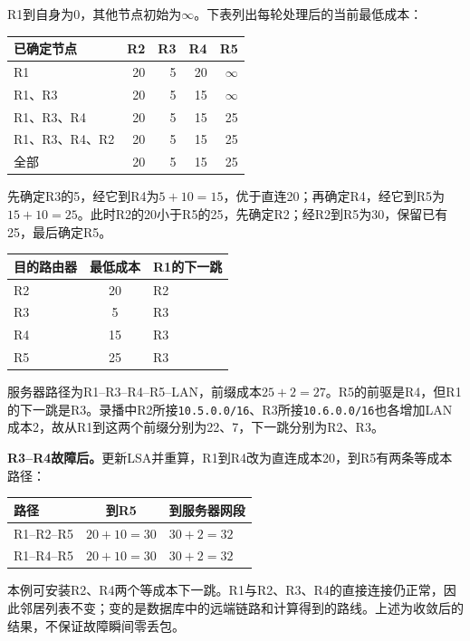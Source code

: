 \begin{workedsolution}
R1到自身为0，其他节点初始为$\infty$。下表列出每轮处理后的当前最低成本：
\begin{center}
\small
\begin{tabular}{@{}lrrrr@{}}
\toprule
已确定节点 & R2 & R3 & R4 & R5 \\
\midrule
R1 & 20 & 5 & 20 & $\infty$ \\
R1、R3 & 20 & 5 & 15 & $\infty$ \\
R1、R3、R4 & 20 & 5 & 15 & 25 \\
R1、R3、R4、R2 & 20 & 5 & 15 & 25 \\
全部 & 20 & 5 & 15 & 25 \\
\bottomrule
\end{tabular}
\end{center}

先确定R3的5，经它到R4为$5+10=15$，优于直连20；再确定R4，经它到R5为$15+10=25$。此时R2的20小于R5的25，先确定R2；经R2到R5为30，保留已有25，最后确定R5。

\begin{center}
\small
\begin{tabular}{@{}lcl@{}}
\toprule
目的路由器 & 最低成本 & R1的下一跳 \\
\midrule
R2 & 20 & R2 \\
R3 & 5 & R3 \\
R4 & 15 & R3 \\
R5 & 25 & R3 \\
\bottomrule
\end{tabular}
\end{center}

服务器路径为R1--R3--R4--R5--LAN，前缀成本$25+2=27$。R5的前驱是R4，但R1的下一跳是R3。录播中R2所接\texttt{10.5.0.0/16}、R3所接\texttt{10.6.0.0/16}也各增加LAN成本2，故从R1到这两个前缀分别为22、7，下一跳分别为R2、R3。

\textbf{R3--R4故障后。}更新LSA并重算，R1到R4改为直连成本20，到R5有两条等成本路径：
\begin{center}
\small
\begin{tabular}{@{}lcl@{}}
\toprule
路径 & 到R5 & 到服务器网段 \\
\midrule
R1--R2--R5 & $20+10=30$ & $30+2=32$ \\
R1--R4--R5 & $20+10=30$ & $30+2=32$ \\
\bottomrule
\end{tabular}
\end{center}
本例可安装R2、R4两个等成本下一跳。R1与R2、R3、R4的直接连接仍正常，因此邻居列表不变；变的是数据库中的远端链路和计算得到的路线。上述为收敛后的结果，不保证故障瞬间零丢包。
\end{workedsolution}

